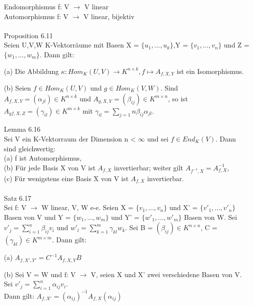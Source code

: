 Endomorphismus \hspace*{3.5mm} f: V $\to$ V \hspace*{4mm} linear\\
Automorphismus \hspace*{4mm} f: V $\to$ V \hspace*{4mm} linear, bijektiv\\
\\
Proposition 6.11\\
Seien U,V,W K-Vektorräume mit Basen X = $\{u_1,...,u_k\}$,Y = $\{v_1,...,v_n\}$ und Z = $\{w_1,...,w_m\}$. Dann gilt:
\begin{compactenum}
\item[(a)] Die Abbildung $\kappa: Hom_K(U,V) \to K^{n \times k}, f \mapsto A_{f,X,Y}$ ist ein Isomorphismus.
\item[(b)] Seien $f \in Hom_K(U,V)$ und $g \in Hom_K(V,W)$. Sind $A_{f,X,Y} = (\alpha_{jl}) \in K^{n \times k}$ und $A_{g,X,Y} = (\beta_{ij}) \in K^{m \times n}$, so ist $A_{gf,X,Z} = (\gamma_{il}) \in K^{m \times k}$ mit
$\gamma_{il} = \sum\nolimits_{j=1}{n} \beta_{ij} \alpha_{jl}$.\\
\end{compactenum}
Lemma 6.16\\
Sei V ein K-Vektorraum der Dimension n < $\infty$ und sei $f \in End_K (V)$. Dann sind gleichwertig:\\
(a) f ist Automorphismus,\\
(b) Für jede Basis X von V ist $A_{f,X}$ invertierbar; weiter gilt $A_{f^{-1},X} = A^{-1}_{f,X}$,\\
(c) Für wenigstens eine Basis X von V ist $A_{f,X}$ invertierbar.\\
\\
Satz 6.17\\
Sei f: V $\to$ W linear, V, W e-e. Seien X = $\{v_1, …, v_n\}$ und X' = $\{v'_1, …, v'_n\}$ Basen von V und Y = $\{w_1, …, w_m\}$ und Y' = $\{w'_1, …, w'_m\}$ Basen von W. Sei $v'_j = \sum\nolimits_{i=1}^{n} \beta_{ij} v_i$ und $w'_l = \sum\nolimits_{k=1}^{m} \gamma_{kl} w_k$. Sei B = $(\beta_{ij}) \in K^{n \times n}$, C = $(\gamma_{kl}) \in K^{m \times m}$. Dann gilt:
\begin{compactenum}
\item[(a)] $A_{f, X', Y'} = C^{-1} A_{f, X, Y} B$
\item[(b)] Sei V = W und f: V $\to$ V, seien X und X' zwei verschiedene Basen von V. Sei $v'_j = \sum\nolimits_{i=1}^{n} \alpha_{ij} v_i$.\\
Dann gilt: $A_{f, X'} = (\alpha_{ij})^{-1} A_{f, X} (\alpha_{ij})$\\
\end{compactenum}
